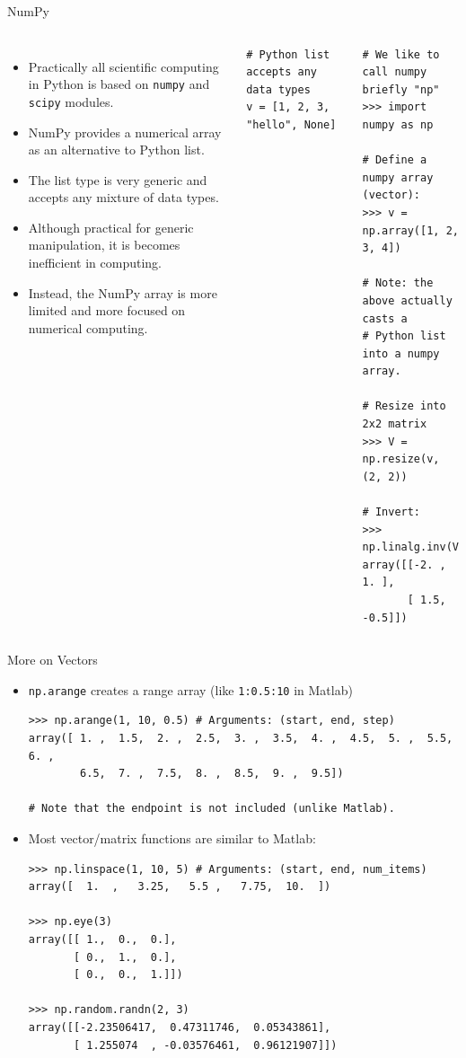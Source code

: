 \documentclass[10pt, aspectratio=169]{beamer} %
\begin{document}
\begin{frame}[fragile,allowframebreaks=0.8]
 {NumPy}
\begin{columns}%
\begin{itemize}
\item Practically all scientific computing in Python is based on \verb+numpy+ and \verb+scipy+ modules.
\item NumPy provides a numerical array as an alternative to Python list.
\item The list type is very generic and accepts any mixture of data types.
\item Although practical for generic manipulation, it is becomes inefficient in computing.
\item Instead, the NumPy array is more limited and more focused on numerical computing.
\end{itemize}
\begin{lstlisting}
# Python list accepts any data types
v = [1, 2, 3, "hello", None]
\end{lstlisting}
\begin{lstlisting}
# We like to call numpy briefly "np"
>>> import numpy as np 

# Define a numpy array (vector):
>>> v = np.array([1, 2, 3, 4])

# Note: the above actually casts a 
# Python list into a numpy array.

# Resize into 2x2 matrix
>>> V = np.resize(v, (2, 2))

# Invert:
>>> np.linalg.inv(V)
array([[-2. ,  1. ],
       [ 1.5, -0.5]])
\end{lstlisting}

\end{columns}
\end{frame}

\begin{frame}[fragile,allowframebreaks=0.8]
 {More on Vectors}
\begin{itemize}
\item \verb+np.arange+ creates a range array (like \verb+1:0.5:10+ in Matlab)
\begin{lstlisting}
>>> np.arange(1, 10, 0.5) # Arguments: (start, end, step)
array([ 1. ,  1.5,  2. ,  2.5,  3. ,  3.5,  4. ,  4.5,  5. ,  5.5,  6. ,
        6.5,  7. ,  7.5,  8. ,  8.5,  9. ,  9.5])
				
# Note that the endpoint is not included (unlike Matlab).
\end{lstlisting}
\item Most vector/matrix functions are similar to Matlab:
\begin{lstlisting}
>>> np.linspace(1, 10, 5) # Arguments: (start, end, num_items)
array([  1.  ,   3.25,   5.5 ,   7.75,  10.  ])

>>> np.eye(3)
array([[ 1.,  0.,  0.],
       [ 0.,  1.,  0.],
       [ 0.,  0.,  1.]])
			
>>> np.random.randn(2, 3)
array([[-2.23506417,  0.47311746,  0.05343861],
       [ 1.255074  , -0.03576461,  0.96121907]])
\end{lstlisting}
\end{itemize}
\end{frame}
\end{document}
